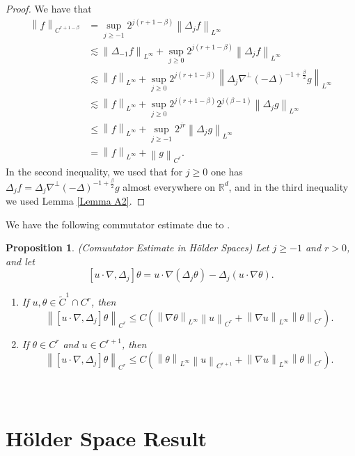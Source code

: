 \documentclass[12pt,xcolor=svgnames]{amsart}
\newtheorem{proposition}[theorem]{Proposition}
\newcommand{\R}{\mathbb{R}}
\newcommand{\norm}[2]{\left\lVert#1\right\rVert_{#2}}
\begin{document}
\begin{proof}
We have that 
\begin{align*}
\norm{f}{C^{r+1-\beta}} &= \sup_{j \geq -1} 2^{j(r+1-\beta)}\norm{\Delta_j f}{L^{\infty}}\\
&\lesssim 
\norm{\Delta_{-1}f}{L^{\infty}}+\sup_{j \geq 0} 2^{j(r+1-\beta)}\norm{\Delta_j f}{L^{\infty}}\\
&\lesssim
\norm{f}{L^{\infty}}+\sup_{j \geq 0} 2^{j(r+1-\beta)}\norm{\Delta_j \nabla^{\perp}(-\Delta)^{-1+\frac{\beta}{2}}g}{L^{\infty}}\\
&\lesssim
\norm{f}{L^{\infty}}+\sup_{j \geq 0} 2^{j(r+1-\beta)}2^{j(\beta-1)}\norm{\Delta_j g}{L^{\infty}}\\
&\leq 
\norm{f}{L^{\infty}}+\sup_{j \geq -1} 2^{jr}\norm{\Delta_j g}{L^{\infty}}\\
&=
\norm{f}{L^{\infty}}+\norm{g}{C^r}.
\end{align*}
In the second inequality, we used that for $j\geq 0$ one has $\Delta_j f = \Delta_j\nabla^{\perp}(-\Delta)^{-1+\frac{\beta}{2}} g$ almost everywhere on $\R^d$, and in the third inequality we used Lemma \ref{Lemma A2}.
\end{proof}

We have the following commutator estimate due to \cite{5}.
\begin{proposition}(Comuutator Estimate in Hölder Spaces)
\label{Holder Commutator Estimate}Let $j \geq -1$ and $r>0$, and let 
$$[u\cdot\nabla,\Delta_j]\theta=u\cdot\nabla(\Delta_j\theta)-\Delta_j(u\cdot\nabla\theta).$$
\begin{enumerate}
\item If $u,\theta \in \tilde{C}^1 \cap C^r$, then
\begin{equation*}
\norm{[u\cdot\nabla,\Delta_j]\theta}{C^r} \leq C\left(\norm{\nabla \theta}{L^{\infty}}\norm{u}{C^r} + \norm{\nabla u}{L^{\infty}}\norm{\theta}{C^r}\right).
\end{equation*}

\item If $\theta \in C^r$ and $u \in C^{r+1}$, then
\begin{equation*}
\norm{[u\cdot\nabla,\Delta_j]\theta}{C^r} \leq C\left(\norm{\theta}{L^{\infty}}\norm{u}{C^{r+1}} + \norm{\nabla u}{L^{\infty}}\norm{\theta}{C^r}\right).
\end{equation*}
\end{enumerate}
\end{proposition}


\section{\\Hölder Space Result}
\end{document}
